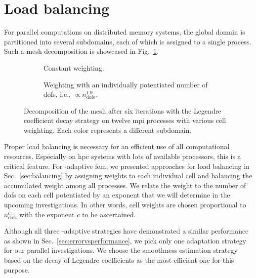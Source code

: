 \section{Load balancing}
\label{sec:heuristics}


For parallel computations on distributed memory systems, the global domain is partitioned into several subdomains, each of which is assigned to a single process. Such a mesh decomposition is showcased in Fig.~\ref{fig:decomposition}.

\begin{figure}
\centering
\begin{subfigure}{1\textwidth}
  \centering
  
  \caption{Constant weighting.}
\end{subfigure}
\begin{subfigure}{1\textwidth}
  \centering
  
  \caption{Weighting with an individually potentiated number of \glspl{dof}, i.e., $\propto n_\text{dofs}^{1.9}$.}
\end{subfigure}
\caption[Decomposition of the mesh with various cell weighting.]{Decomposition of the mesh after six iterations with the Legendre coefficient decay strategy on twelve \gls{mpi} processes with various cell weighting. Each color represents a different subdomain.}
\label{fig:decomposition}
\end{figure}

Proper load balancing is necessary for an efficient use of all computational resources. Especially on \gls{hpc} systems with lots of available processors, this is a critical feature. For \hp-adaptive \gls{fem}, we presented approaches for load balancing in Sec.~\ref{sec:balancing} by assigning weights to each individual cell and balancing the accumulated weight among all processes. We relate the weight to the number of \glspl{dof} on each cell potentiated by an exponent that we will determine in the upcoming investigations. In other words, cell weights are chosen proportional to $n_\text{dofs}^c$ with the exponent $c$ to be ascertained.

Although all three \hp-adaptive strategies have demonstrated a similar performance as shown in Sec.~\ref{sec:errorvsperformance}, we pick only one adaptation strategy for our parallel investigations. We choose the smoothness estimation strategy based on the decay of Legendre coefficients as the most efficient one for this purpose.

